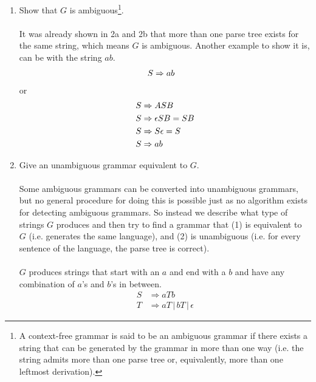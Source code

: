 \documentclass[10pt,a4paper,final]{article}
\begin{document}
\begin{enumerate}
\begin{enumerate}
  \item %
  Show that $G$ is ambiguous\footnote{A context-free grammar is said to be an ambiguous grammar if there
  exists a string that can be generated by the grammar in more than one way (i.e. the string admits more
  than one parse tree or, equivalently, more than one leftmost derivation).}. \\
  \\
  It was already shown in 2a and 2b that more than one parse tree exists for the same string, which
  means $G$ is ambiguous. Another example to show it is, can be with the string $ab$.
  \begin{align}
    \setcounter{equation}{1} %
    S &\Rightarrow ab
  \end{align}
  or
  \begin{align}
    \setcounter{equation}{0}
    S &\Rightarrow ASB \\
    \setcounter{equation}{4}
    S &\Rightarrow \epsilon SB = SB \\
    \setcounter{equation}{6}
    S &\Rightarrow S \epsilon = S \\
    \setcounter{equation}{1}
    S &\Rightarrow ab
  \end{align}

  \item %
  Give an unambiguous grammar equivalent to $G$. \\
  \\
  Some ambiguous grammars can be converted into unambiguous grammars, but no general procedure
  for doing this is possible just as no algorithm exists for detecting ambiguous grammars.
  So instead we describe what type of strings $G$ produces and then try to find a grammar that
  (1) is equivalent to $G$ (i.e. generates the same language), and (2) is unambiguous
  (i.e. for every sentence of the language, the parse tree is correct).\\
  \\
  $G$ produces strings that start with an $a$ and end with a $b$ and have any combination of $a$'s and
  $b$'s in between.
  \begin{align*}
    S &\Rightarrow aTb \\
    T &\Rightarrow aT \,|\, bT \,|\, \epsilon
  \end{align*}
\end{enumerate}


\end{enumerate}
\end{document}
